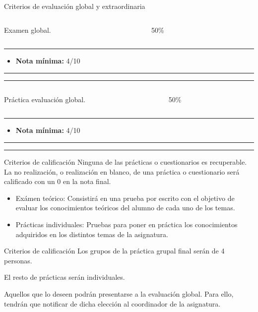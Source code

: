 \begin{frame}{Criterios de evaluación global y extraordinaria}
\begin{columns}[T]
\begin{column}{.49\textwidth}
Examen global.
\end{column}
\hfill
\begin{column}{.49\textwidth}
\centering
\alert{\Huge 50\%}
\end{column}
\end{columns}
\vfill
\hrule

\begin{itemize}
    \item \textbf{Nota mínima:} 4/10
\end{itemize}
\vfill
\hrule
\hrule

\vfill
\begin{columns}[T]
\begin{column}{.49\textwidth}
Práctica evaluación global.
\end{column}
\hfill
\begin{column}{.49\textwidth}
\centering
\alert{\Huge 50\%}
\end{column}
\end{columns}
\vfill
\hrule

\begin{itemize}
    \item \textbf{Nota mínima:} 4/10
\end{itemize}
\vfill
\hrule
\hrule
\vfill

\end{frame}

\begin{frame}{Criterios de calificación}
Ninguna de las prácticas o cuestionarios es recuperable. \alert{La no realización, o realización en blanco, de una práctica o cuestionario será calificado con un 0 en la nota final}.
\begin{itemize}
    \item \alert{Exámen teórico}: Consistirá en una prueba por escrito con el objetivo de evaluar los conocimientos teóricos del alumno de cada uno de los temas.
    \item \alert{Prácticas individuales}: Pruebas para poner en práctica los conocimientos adquiridos en los distintos temas de la asignatura.
\end{itemize}
\end{frame}

\begin{frame}{Criterios de calificación}
Los grupos de la \alert{práctica grupal} final serán de \alert{4 personas}.

El \alert{resto} de prácticas serán \alert{individuales}.

Aquellos que lo deseen podrán presentarse a la \alert{evaluación global}. Para ello, tendrán que notificar de dicha elección al coordinador de la asignatura.
\end{frame}

